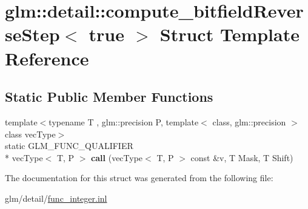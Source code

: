 \hypertarget{structglm_1_1detail_1_1compute__bitfieldReverseStep_3_01true_01_4}{\section{glm\-:\-:detail\-:\-:compute\-\_\-bitfield\-Reverse\-Step$<$ true $>$ Struct Template Reference}
\label{structglm_1_1detail_1_1compute__bitfieldReverseStep_3_01true_01_4}
}
\subsection*{Static Public Member Functions}
\begin{DoxyCompactItemize}
\item 
\hypertarget{structglm_1_1detail_1_1compute__bitfieldReverseStep_3_01true_01_4_a2923caf55050f8fc362ab476ec12bcc2}{{\footnotesize template$<$typename T , glm\-::precision P, template$<$ class, glm\-::precision $>$ class vec\-Type$>$ }\\static G\-L\-M\-\_\-\-F\-U\-N\-C\-\_\-\-Q\-U\-A\-L\-I\-F\-I\-E\-R \\*
vec\-Type$<$ T, P $>$ {\bfseries call} (vec\-Type$<$ T, P $>$ const \&v, T Mask, T Shift)}\label{structglm_1_1detail_1_1compute__bitfieldReverseStep_3_01true_01_4_a2923caf55050f8fc362ab476ec12bcc2}

\end{DoxyCompactItemize}


The documentation for this struct was generated from the following file\-:\begin{DoxyCompactItemize}
\item 
glm/detail/\hyperlink{func__integer_8inl}{func\-\_\-integer.\-inl}\end{DoxyCompactItemize}
